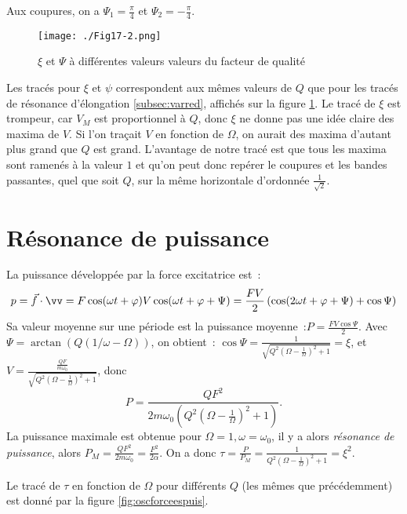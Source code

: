 Aux coupures, on a \(\Psi_1 = \frac{\pi}{4}\) et \(\Psi_2 = -\frac{\pi}{4}\).

\begin{figure}[!h]
  \centering
  \texttt{[image: ./Fig17-2.png]}
  \caption{\(\xi\) et \(\Psi\) à différentes valeurs valeurs du facteur de
  qualité}
  \label{fig:oscforceesvit}
\end{figure}

Les tracés pour \(\xi\) et \(\psi\) correspondent aux mêmes valeurs de \(Q\) que
pour les tracés de résonance d'élongation \ref{subsec:varred}, affichés sur la
figure \ref{fig:oscforceesvit}. Le tracé de \(\xi\) est trompeur, car \(V_M\)
est proportionnel à \(Q\), donc \(\xi\) ne donne pas une idée claire des maxima
de \(V\). Si l'on traçait \(V\) en fonction de \(\Omega\), on aurait des maxima
d'autant plus grand que \(Q\) est grand. L'avantage de notre tracé est que tous
les maxima sont ramenés à la valeur \(1\) et qu'on peut donc repérer le coupures
et les bandes passantes, quel que soit \(Q\), sur la même horizontale d'ordonnée
\(\frac{1}{\sqrt{2}}\).

\section{Résonance de puissance}

La puissance développée par la force excitatrice est~:
\begin{equation}
  p = \vec{f} \cdot \vv = F\cos(\omega t +\varphi) V\cos(\omega t + \varphi + \Psi)
  = \frac{FV}{2}\left(\cos(2\omega t + \varphi + \Psi) + \cos \Psi\right)
\end{equation}
Sa valeur moyenne sur une période est la \og{}puissance moyenne\fg{}~:\(P =
\frac{FV\cos\Psi}{2}\). Avec \(\Psi = \arctan(Q(1/\omega - \Omega))\), on
obtient~: \(\cos \Psi =
\frac{1}{\sqrt{Q^2\left(\Omega-\frac{1}{\Omega}\right)^2+1}} = \xi\), et \(V =
\frac{\frac{QF}{m\omega_0}}{\sqrt{Q^2\left(\Omega-\frac{1}{\Omega}\right)^2+1}}\),
donc
\begin{equation}
  P =
  \frac{QF^2}{2m\omega_0\left(Q^2\left(\Omega-\frac{1}{\Omega}\right)^2+1\right)}.
\end{equation}
La puissance maximale est obtenue pour \(\Omega = 1, \omega = \omega_0\), il y a
alors \emph{résonance de puissance}, alors \(P_M = \frac{QF^2}{2m\omega_0} =
\frac{F^2}{2\alpha}\). On a donc \(\tau = \frac{P}{P_M} =
\frac{1}{Q^2\left(\Omega-\frac{1}{\Omega}\right)^2+1} = \xi^2\).

Le tracé de \(\tau\) en fonction de \(\Omega\) pour différents \(Q\) (les mêmes
que précédemment) est donné par la figure \ref{fig:oscforceespuis}.

